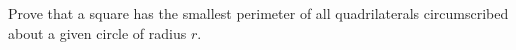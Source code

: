Prove that a square has the smallest perimeter of all quadrilaterals circumscribed about a given circle of radius $r$.
